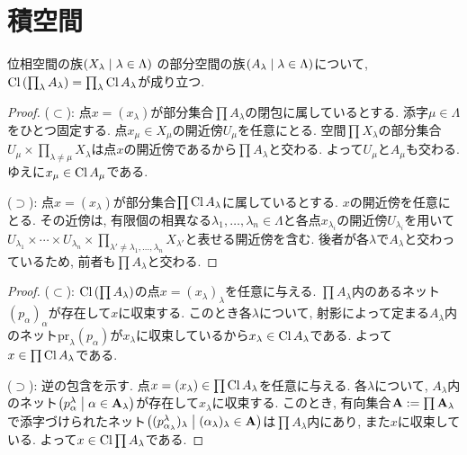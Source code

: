 \documentclass[uplatex, dvipdfmx, a4paper, 12pt, class=jsbook, crop=false]{standalone}
\begin{document}
\section{積空間}
\label{sec:product-spaces}

\newcommand{\directedA}{\mathbf{A}} %
\newcommand{\proj}{\mathrm{pr}} %

\begin{proposition}
	\label{02b3a9}
	位相空間の族$\setfamily{X_\lambda}{\lambda \in \Lambda}$
	の部分空間の族$\setfamily{A_\lambda}{\lambda \in \Lambda}$について,
	$ \mathop{\mathrm{Cl}}\nolimits \left(\prod_\lambda A_\lambda\right) = \prod_\lambda \mathop{\mathrm{Cl}}\nolimits A_\lambda $が成り立つ.
\end{proposition}

\begin{proof}
	($\subset$):
	点$x = (x_\lambda)$が部分集合$\prod A_\lambda$の閉包に属しているとする.
	添字$\mu \in \Lambda$をひとつ固定する.
	点$x_\mu \in X_\mu$の開近傍$U_\mu$を任意にとる.
	空間$\prod X_\lambda$の部分集合$U_\mu \times \prod_{\lambda \neq \mu} X_{\lambda}$は点$x$の開近傍であるから$\prod A_{\lambda}$と交わる.
	よって$U_\mu$と$A_\mu$も交わる. ゆえに$x_\mu \in \mathop{\mathrm{Cl}}\nolimits A_\mu$である.

	($\supset$):
	点$x = (x_\lambda)$が部分集合$\prod \mathop{\mathrm{Cl}}\nolimits A_\lambda$に属しているとする.
	$x$の開近傍を任意にとる.
	その近傍は, 有限個の相異なる$\lambda_1, \ldots, \lambda_n \in \Lambda$と各点$x_{\lambda_i}$の開近傍$U_{\lambda_i}$を用いて$U_{\lambda_1} \times \cdots \times U_{\lambda_n} \times \prod_{\lambda' \neq \lambda_1, \ldots, \lambda_n} X_{\lambda'}$と表せる開近傍を含む.
	後者が各$\lambda$で$A_\lambda$と交わっているため, 前者も$\prod A_\lambda$と交わる.
\end{proof}

\begin{proof}
	($\subset$):
	$\mathop{\mathrm{Cl}}\nolimits \left(\prod A_\lambda\right)$の点$x = (x_\lambda)_\lambda$を任意に与える.
	$\prod A_\lambda$内のあるネット$(p_\alpha)_\alpha$が存在して$x$に収束する.
	このとき各$\lambda$について, 射影によって定まる$A_\lambda$内のネット$\proj_\lambda (p_\alpha)$が$x_\lambda$に収束しているから$x_\lambda \in \mathop{\mathrm{Cl}}\nolimits A_\lambda$である.
	よって$x \in \prod \mathop{\mathrm{Cl}}\nolimits A_\lambda$である.

	($\supset$):
	逆の包含を示す.
	点$x = (x_\lambda) \in \prod \mathop{\mathrm{Cl}}\nolimits A_\lambda$を任意に与える.
	各$\lambda$について, $A_\lambda$内のネット$\setfamily{p^\lambda_\alpha}{\alpha \in \directedA_\lambda}$が存在して$x_\lambda$に収束する.
	このとき, 有向集合$\directedA \defeq \prod \directedA_\lambda$で添字づけられたネット$\setfamily{(p^\lambda_{\alpha_\lambda})_\lambda}{(\alpha_\lambda)_\lambda \in \directedA}$は$\prod A_\lambda$内にあり, また$x$に収束している.
	よって$x \in \mathop{\mathrm{Cl}}\nolimits \prod A_\lambda$である.
\end{proof}
\end{document}

